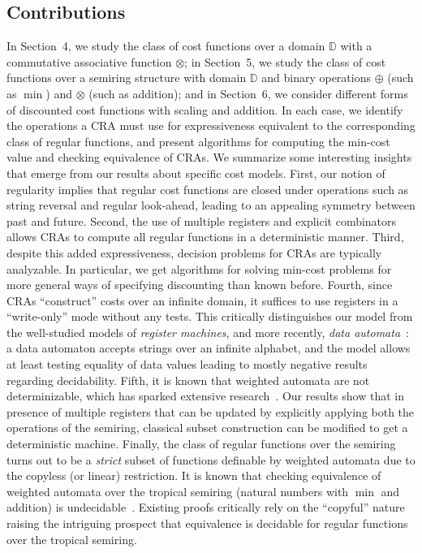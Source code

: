 \documentclass[11pt]{article}
\newcommand{\mypar}[1]{\subsection{#1}}
\newcommand{\domain}{\ensuremath{\mathbb{D}}}
\def\myplus{\otimes}
\def\mytimes{\oplus}
\begin{document}
\mypar{Contributions}
In Section~4, we study the class of cost functions over a domain
$\domain$ with a commutative associative function $\myplus$; in
Section~5, we study the class of cost functions over a semiring
structure with domain $\domain$ and binary operations $\mytimes$ (such
as $\min$) and $\myplus$ (such as addition); and in Section~6, we
consider different forms of discounted cost functions with scaling and
addition.  In each case, we identify the operations a CRA must use for
expressiveness equivalent to the corresponding class of regular
functions, and present algorithms for computing the min-cost value and
checking equivalence of CRAs.  We summarize some interesting insights
that emerge from our results about specific cost models.  First, our
notion of regularity implies that regular cost functions are closed
under operations such as string reversal and regular look-ahead,
leading to an appealing symmetry between past and future.  Second, the
use of multiple registers and explicit combinators allows CRAs to
compute all regular functions in a deterministic manner.  Third,
despite this added expressiveness, decision problems for CRAs are
typically analyzable.  In particular, we get algorithms for solving
min-cost problems for more general ways of specifying discounting than
known before.  Fourth, since CRAs ``construct'' costs over an infinite
domain, it suffices to use registers in a ``write-only'' mode without
any tests.  This critically distinguishes our model from the
well-studied models of {\em register machines}, and more recently,
{\em data
automata\/}~\cite{kaminski_finite_1994,neven_finite_2004,bjorklund_notions_2010}:
a data automaton accepts strings over an infinite alphabet, and the
model allows at least testing equality of data values leading to
mostly negative results regarding decidability.  Fifth, it is known
that weighted automata are not determinizable, which has sparked
extensive research~\cite{mohri_weighted_2009,
kirsten_determinization_2005}.  Our results show that in presence of
multiple registers that can be updated by explicitly applying both the
operations of the semiring, classical subset construction can be
modified to get a deterministic machine.  Finally, the class of
regular functions over the semiring turns out to be a {\em strict\/}
subset of functions definable by weighted automata due to the copyless
(or linear) restriction.  It is known that checking equivalence of
weighted automata over the tropical semiring (natural numbers with
$\min$ and addition) is
undecidable~\cite{krob_equality_1992,almagor_what_2011}. Existing
proofs critically rely on the ``copyful'' nature raising the
intriguing prospect that equivalence is decidable for regular
functions over the tropical semiring.
\end{document}
